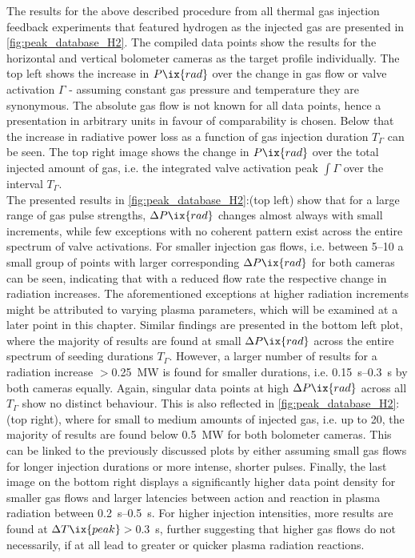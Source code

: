 %
        The results for the above described procedure from all thermal gas injection feedback experiments that featured hydrogen as the injected gas are presented in \cref{fig:peak_database_H2}. The compiled data points show the results for the horizontal and vertical bolometer cameras as the target profile individually. The top left shows the increase in $P\ix{rad}$ over the change in gas flow or valve activation $\Gamma$ - assuming constant gas pressure and temperature they are synonymous. The absolute gas flow is not known for all data points, hence a presentation in arbitrary units in favour of comparability is chosen. Below that the increase in radiative power loss as a function of gas injection duration $T_{\Gamma}$ can be seen. The top right image shows the change in $P\ix{rad}$ over the total injected amount of gas, i.e. the integrated valve activation peak $\int\Gamma$ over the interval $T_{\Gamma}$.\\%
        The presented results in \cref{fig:peak_database_H2}:(top left) show that for a large range of gas pulse strengths, $\Delta P\ix{rad}$ changes almost always with small increments, while few exceptions with no coherent pattern exist across the entire spectrum of valve activations. For smaller injection gas flows, i.e. between \SIrange{5}{10}{\arbitraryunit} a small group of points with larger corresponding $\Delta P\ix{rad}$ for both cameras can be seen, indicating that with a reduced flow rate the respective change in radiation increases. The aforementioned exceptions at higher radiation increments might be attributed to varying plasma parameters, which will be examined at a later point in this chapter. Similar findings are presented in the bottom left plot, where the majority of results are found at small $\Delta P\ix{rad}$ across the entire spectrum of seeding durations $T_{\Gamma}$. However, a larger number of results for a radiation increase $>$\SI{0.25}{\mega\watt} is found for smaller durations, i.e. \SIrange{0.15}{0.3}{\second} by both cameras equally. Again, singular data points at high $\Delta P\ix{rad}$ across all $T_{\Gamma}$ show no distinct behaviour. This is also reflected in \cref{fig:peak_database_H2}:(top right), where for small to medium amounts of injected gas, i.e. up to \SI{20}{\arbitraryunit}, the majority of results are found below \SI{0.5}{\mega\watt} for both bolometer cameras. This can be linked to the previously discussed plots by either assuming small gas flows for longer injection durations or more intense, shorter pulses. Finally, the last image on the bottom right displays a significantly higher data point density for smaller gas flows and larger latencies between action and reaction in plasma radiation between \SIrange{0.2}{0.5}{\second}. For higher injection intensities, more results are found at $\Delta T\ix{peak}>$\,\SI{0.3}{\second}, further suggesting that higher gas flows do not necessarily, if at all lead to greater or quicker plasma radiation reactions.\\%
